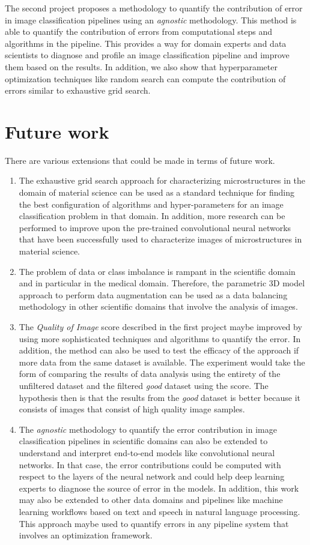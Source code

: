 The second project proposes a methodology to quantify the contribution of error in image classification pipelines using an \textit{agnostic} methodology. This method is able to quantify the contribution of errors from computational steps and algorithms in the pipeline. This provides a way for domain experts and data scientists to diagnose and profile an image classification pipeline and improve them based on the results. In addition, we also show that hyperparameter optimization techniques like random search can compute the contribution of errors similar to exhaustive grid search.

\section{Future work}
There are various extensions that could be made in terms of future work.
\begin{enumerate}

\item The exhaustive grid search approach for characterizing microstructures in the domain of material science can be used as a standard technique for finding the best configuration of algorithms and hyper-parameters for an image classification problem in that domain. In addition, more research can be performed to improve upon the pre-trained convolutional neural networks that have been successfully used to characterize images of microstructures in material science.
\item The problem of data or class imbalance is rampant in the scientific domain and in particular in the medical domain. Therefore, the parametric 3D model approach to perform data augmentation can be used as a data balancing methodology in other scientific domains that involve the analysis of images. 
\item The \textit{Quality of Image} score described in the first project maybe improved by using more sophisticated techniques and algorithms to quantify the error. In addition, the method can also be used to test the efficacy of the approach if more data from the same dataset is available. The experiment would take the form of comparing the results of data analysis using the entirety of the unfiltered dataset and the filtered \textit{good} dataset using the score. The hypothesis then is that the results from the \textit{good} dataset is better because it consists of images that consist of high quality image samples.

\item The \textit{agnostic} methodology to quantify the error contribution in image classification pipelines in scientific domains can also be extended  to understand and interpret end-to-end models like convolutional neural networks. In that case, the error contributions could be computed with respect to the layers of the neural network and could help deep learning experts to diagnose the source of error in the models. In addition, this work may also be extended to other data domains and pipelines like machine learning workflows based on text and speech in natural language processing. This approach maybe used to quantify errors in any pipeline system that involves an optimization framework. 

\end{enumerate}